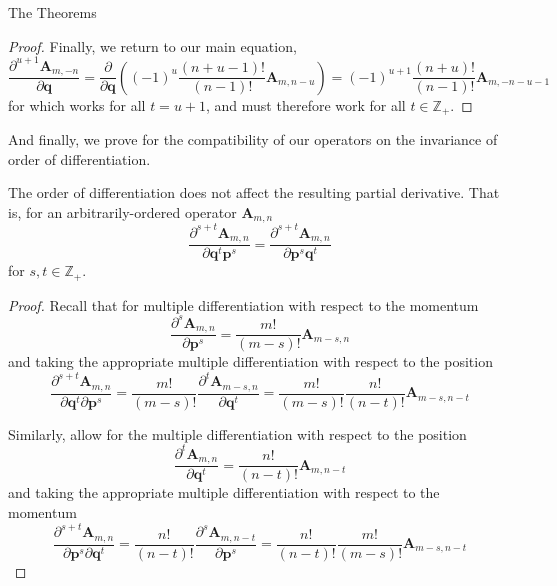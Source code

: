 \documentclass[aspectratio=169]{beamer}
\begin{document}
\begin{frame}[allowframebreaks]{The Theorems}
\begin{proof}
			Finally, we return to our main equation,
			\begin{equation}
				\frac{\partial^{u+1}\textbf{A}_{m,-n}}{\partial\textbf{q}}=\frac{\partial}{\partial\textbf{q}}\left((-1)^u\frac{(n+u-1)!}{(n-1)!}\textbf{A}_{m,n-u}\right) =(-1)^{u+1}\frac{(n+u)!}{(n-1)!}\textbf{A}_{m,-n-u-1}
			\end{equation}
			for which works for all $t=u+1$, and must therefore work for all $t\in\mathbb{Z}_+$.
		\end{proof}
		
		And finally, we prove for the compatibility of our operators on the invariance of order of differentiation.
		\begin{theorem}
			The order of differentiation does not affect the resulting partial derivative. That is, for an arbitrarily-ordered operator $\textbf{A}_{m,n}$
			\begin{equation}
				\frac{\partial^{s+t}\textbf{A}_{m,n}}{\partial\textbf{q}^t\textbf{p}^s}=\frac{\partial^{s+t}\textbf{A}_{m,n}}{\partial\textbf{p}^s\textbf{q}^t}
			\end{equation}
			for $s,t\in\mathbb{Z}_+$.
		\end{theorem}
		\begin{proof}
			Recall that for multiple differentiation with respect to the momentum
			\begin{equation}
				\frac{\partial^s\textbf{A}_{m,n}}{\partial\textbf{p}^s}=\frac{m!}{(m-s)!}\textbf{A}_{m-s,n}
			\end{equation}
			and taking the appropriate multiple differentiation with respect to the position
			\begin{equation}
				\frac{\partial^{s+t}\textbf{A}_{m,n}}{\partial\textbf{q}^t\partial\textbf{p}^s}=\frac{m!}{(m-s)!}\frac{\partial^t\textbf{A}_{m-s,n}}{\partial\textbf{q}^t}=\frac{m!}{(m-s)!}\frac{n!}{(n-t)!}\textbf{A}_{m-s,n-t}
			\end{equation}
			
			Similarly, allow for the multiple differentiation with respect to the position
			\begin{equation}
				\frac{\partial^t\textbf{A}_{m,n}}{\partial\textbf{q}^t}=\frac{n!}{(n-t)!}\textbf{A}_{m,n-t}
			\end{equation}
			and taking the appropriate multiple differentiation with respect to the momentum
			\begin{equation}
				\frac{\partial^{s+t}\textbf{A}_{m,n}}{\partial\textbf{p}^s\partial\textbf{q}^t}=\frac{n!}{(n-t)!}\frac{\partial^s\textbf{A}_{m,n-t}}{\partial\textbf{p}^s}=\frac{n!}{(n-t)!}\frac{m!}{(m-s)!}\textbf{A}_{m-s,n-t}
			\end{equation}
			

\end{proof}
\end{frame}
\end{document}
